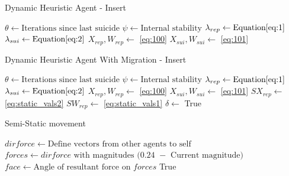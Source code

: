 \documentclass{UoYCSproject}
\begin{document}
\begin{algorithm}
\caption{Dynamic Heuristic Agent - Insert}
\label{Agent_Control_Loop3}
\begin{algorithmic}[1]
\State $\theta \gets \text{Iterations since last suicide}$
\State $\psi \gets \text{Internal stability}$
\State $\lambda_{rep} \gets \text{Equation} \ref{eq:1}$
\State $\lambda_{sui}  \gets \text{Equation} \ref{eq:2}$
\State $X_{rep}, W_{rep} \gets $ \ref{eq:100}
\State $X_{sui}, W_{sui} \gets $ \ref{eq:101}
\end{algorithmic}
\end{algorithm}

\begin{algorithm}
\caption{Dynamic Heuristic Agent With Migration - Insert}
\label{Agent_Control_Loop3}
\begin{algorithmic}[1]
\State $\theta \gets \text{Iterations since last suicide}$
\State $\psi \gets \text{Internal stability}$
\State $\lambda_{rep} \gets \text{Equation} \ref{eq:1}$
\State $\lambda_{sui}  \gets \text{Equation} \ref{eq:2}$
\State $X_{rep}, W_{rep} \gets $ \ref{eq:100}
\State $X_{sui}, W_{sui} \gets $ \ref{eq:101}
\State
\State $SX_{rep} \gets $ \ref{eq:static_vals2}
\State $SW_{rep} \gets $ \ref{eq:static_vals1}
\State
\State $\delta \gets$ 
\State
{}
\State {}
\State
{}
\State {}
\State \Return True
\EndIf
\EndIf
\end{algorithmic}
\end{algorithm}


\begin{algorithm}
\caption{Semi-Static movement}
\label{semistaticmove}
\begin{algorithmic}[1]
\State $dirforce \gets \text{Define vectors from other agents to self}$
\State $forces \gets \text{$dirforce$ with magnitudes $($0.24 $-$ Current magnitude$)$}$
\State
\State {}
\State
\State $face \gets \text{Angle of resultant force on $forces$}$
\State {}
\State
\State \Return True
\EndProcedure
\end{algorithmic}
\end{algorithm}
\end{document}
